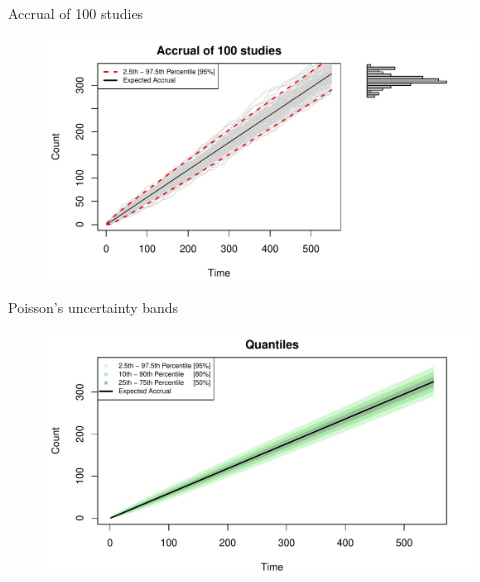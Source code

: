 \documentclass[english]{beamer}\usepackage[]{graphicx}\usepackage[]{xcolor}
\makeatletter
\def\maxwidth{ %
  \ifdim\Gin@nat@width>\linewidth
    \linewidth
  \else
    \Gin@nat@width
  \fi
}
\newenvironment{knitrout}{}{} %
\makeatother
\begin{document}
\begin{frame}{Accrual of 100 studies}

\begin{figure}
\begin{knitrout}
\color{fgcolor}
\includegraphics[width=\maxwidth]{figures/figunnamed-chunk-4-1} 
\end{knitrout}

\end{figure}

\end{frame}



\begin{frame}{Poisson's uncertainty bands}


\begin{figure}
\begin{knitrout}
\color{fgcolor}
\includegraphics[width=\maxwidth]{figures/figunnamed-chunk-5-1} 
\end{knitrout}
\end{figure}

\end{frame}
\end{document}
